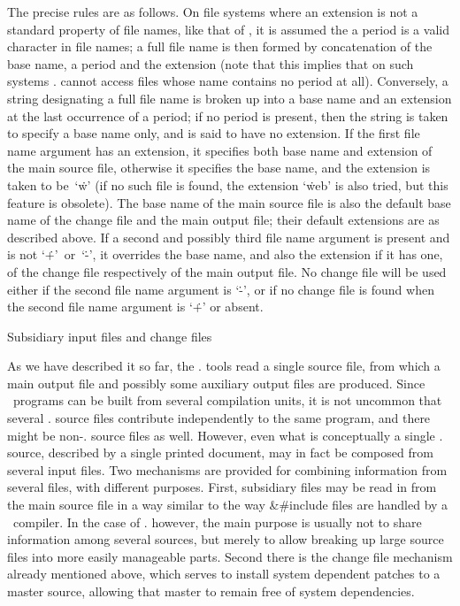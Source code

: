 The precise rules are as follows. On file systems where an extension is not
a standard property of file names, like that of , it is assumed
the a period is a valid character in file names; a full file name is then
formed by concatenation of the base name, a period and the extension (note
that this implies that on such systems \CWEB. cannot access files whose name
contains no period at all). Conversely, a string designating a full file
name is broken up into a base name and an extension at the last occurrence
of a period; if no period is present, then the string is taken to specify a
base name only, and is said to have no extension. If the first file name
argument has an extension, it specifies both base name and extension of the
main source file, otherwise it specifies the base name, and the extension is
taken to be~`\.w' (if no such file is found, the extension `\.{web}' is also
tried, but this feature is obsolete). The base name of the main source file
is also the default base name of the change file and the main output file;
their default extensions are as described above. If a second and possibly
third file name argument is present and is not `\.+'~or~`\.-', it overrides
the base name, and also the extension if it has one, of the change file
respectively of the main output file. No change file will be used either if
the second file name argument is `\.-', or if no change file is found when the
second file name argument is `\.+' or absent.


\beginsection Subsidiary input files and change files

As we have described it so far, the \CWEB. tools read a single source file,
from which a main output file and possibly some auxiliary output files are
produced. Since \Cee~programs can be built from several compilation units,
it is not uncommon that several \CWEB. source files contribute independently
to the same program, and there might be non-\CWEB. source files as well.
However, even what is conceptually a single \CWEB. source, described by a
single printed document, may in fact be composed from several input files.
Two mechanisms are provided for combining information from several files,
with different purposes. First, subsidiary files may be read in from the
main source file in a way similar to the way \&{\#include} files are handled
by a \Cee~compiler. In the case of \CWEB. however, the main purpose is
usually not to share information among several sources, but merely to allow
breaking up large source files into more easily manageable parts. Second
there is the change file mechanism already mentioned above, which serves to
install system dependent patches to a master source, allowing that master to
remain free of system dependencies.

